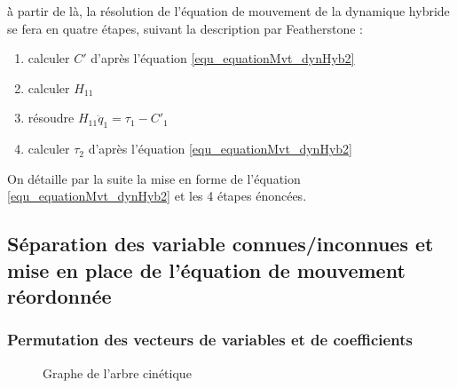\documentclass{report}
\begin{document}
\`{à} partir de là, la résolution de l'équation de mouvement de la dynamique hybride se fera en quatre étapes, suivant la description par Featherstone \cite[section 9.1 p173]{bib_featherstone}:
\begin{enumerate}
\item calculer $C'$ d'après l'équation \eqref{equ_equationMvt_dynHyb2}
\item calculer $H_{11}$
\item résoudre $H_{11} \ddot{q}_1 = \tau_1 - C'_1$
\item calculer $\tau_2$ d'après l'équation \eqref{equ_equationMvt_dynHyb2}
\end{enumerate}

\noindent
On détaille par la suite la mise en forme de l'équation \eqref{equ_equationMvt_dynHyb2} et les 4 étapes énoncées.


\subsection{Séparation des variable connues/inconnues et mise en place de l'équation de mouvement réordonnée} \label{ch_impl_equReord}

\subsubsection{Permutation des vecteurs de variables et de coefficients}

\begin{figure}
  \begin{center}
    \caption{Graphe de l'arbre cinétique}
    \label{fig_chdaArbreK1}
  \end{center}
\end{figure}
\end{document}
